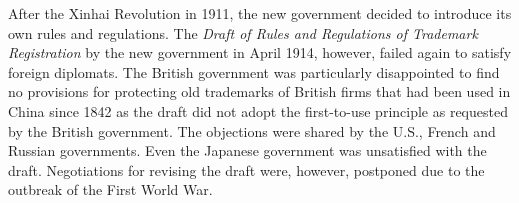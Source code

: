 \documentclass[12pt]{article}
\begin{document}
\begin{CJK*}{UTF8}{gbsn}
After the Xinhai Revolution in 1911, the new government decided to introduce its own rules and regulations. The \emph{Draft of Rules and Regulations of Trademark Registration} %
by the new government in April 1914, however, failed again to satisfy foreign diplomats. The British government was particularly disappointed to find no provisions for protecting old trademarks of British firms that had been used in China since 1842 as the draft did not adopt the first-to-use principle as requested by the British government. The objections were shared by the U.S., French and Russian governments. Even the Japanese government was unsatisfied with the draft. %
Negotiations for revising the draft were, however, postponed due to the outbreak of the First World War.
\end{CJK*}
\end{document}
